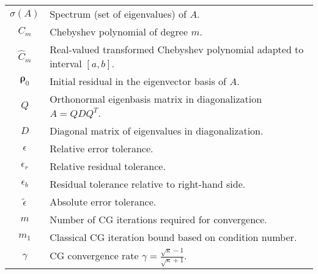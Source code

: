 \begin{longtable}{c p{10cm}}
    $\sigma(A)$                      & Spectrum (set of eigenvalues) of $A$.                                                                       \\
    $C_m$                            & Chebyshev polynomial of degree $m$.                                                                         \\
    $\hat{C}_m$                      & Real-valued transformed Chebyshev polynomial adapted to interval $[a,b]$.                                   \\
    $\mathbf{\rho}_0$                & Initial residual in the eigenvector basis of $A$.                                                           \\
    $Q$                              & Orthonormal eigenbasis matrix in diagonalization $A = QDQ^T$.                                               \\
    $D$                              & Diagonal matrix of eigenvalues in diagonalization.                                                          \\
    $\epsilon$                       & Relative error tolerance.                                                                                   \\
    $\epsilon_r$                     & Relative residual tolerance.                                                                                \\
    $\epsilon_b$                     & Residual tolerance relative to right-hand side.                                                             \\
    $\tilde{\epsilon}$               & Absolute error tolerance.                                                                                   \\
    $m$                              & Number of CG iterations required for convergence.                                                           \\
    $m_1$                            & Classical CG iteration bound based on condition number.                                                     \\
    $\gamma$                         & CG convergence rate $\gamma = \frac{\sqrt{\kappa} - 1}{\sqrt{\kappa} + 1}$.                                 \\
\end{longtable}

